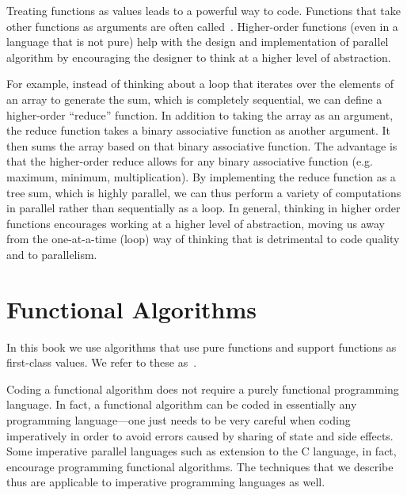 \begin{gram}
Treating functions as values leads to a powerful way to code.  
%
Functions that take other functions as arguments are often
called~.
Higher-order functions (even in a language that is not pure)
help with the design and implementation of parallel algorithm by
encouraging the designer to think at a higher level of abstraction.

For example, instead of thinking about a loop that iterates over the
elements of an array to generate the sum, which is completely
sequential, we can define a higher-order ``reduce'' function. 
%
In addition to taking the array as an argument, the reduce function
takes a binary associative function as another argument.  It then sums
the array based on that binary associative function.
%
The advantage is that the higher-order reduce allows for any
binary associative function (e.g. maximum, minimum, multiplication).
%
By implementing the reduce function as a tree sum, which is highly
parallel, we can thus perform a variety of computations in parallel
rather than sequentially as a loop.
%
In general, thinking in higher order functions encourages working at a
higher level of abstraction, moving us away from the one-at-a-time
(loop) way of thinking that is detrimental to code quality and
to parallelism.
\end{gram}

\section{Functional Algorithms}

\begin{gram}
In this book we use algorithms that use pure functions and support functions as
first-class values.
We refer to these as~.
\end{gram}

\begin{remark}
Coding a functional algorithm does not require a purely
functional programming language.
%
In fact, a functional algorithm can be coded in essentially any
programming language---one just needs to be very careful when
coding imperatively in order to avoid errors caused by sharing of
state and side effects.  
%
Some imperative parallel languages such as extension to the C
language, in fact, encourage programming functional algorithms.
%
The techniques that we describe thus are applicable to  imperative
programming languages as  well.
\end{remark}


